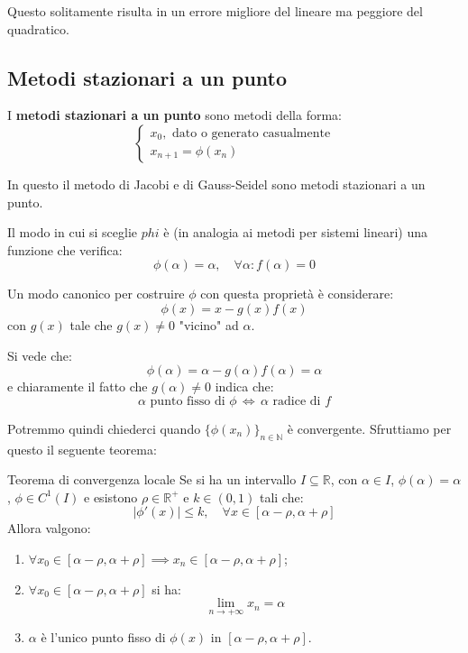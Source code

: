 \documentclass[a4paper,11pt]{article}
\begin{document}
Questo solitamente risulta in un errore migliore del lineare ma peggiore del quadratico.

\subsection{Metodi stazionari a un punto}
I \textbf{metodi stazionari a un punto} sono metodi della forma:
\[
	\begin{cases}
		x_0, \text{ dato o generato casualmente} \\
		x_{n + 1} = \phi(x_n)
	\end{cases}
\]

In questo il metodo di Jacobi e di Gauss-Seidel sono metodi stazionari a un punto.

Il modo in cui si sceglie $phi$ è (in analogia ai metodi per sistemi lineari) una funzione che verifica:
$$
\phi(\alpha) = \alpha, \quad \forall \alpha : f(\alpha) = 0
$$

Un modo canonico per costruire $\phi$ con questa proprietà è considerare:
$$
\phi(x) = x - g(x) f(x)
$$
con $g(x)$ tale che $g(x) \neq 0$ "vicino" ad $\alpha$.

Si vede che:
$$
\phi(\alpha) = \alpha - g(\alpha) f(\alpha) = \alpha
$$
e chiaramente il fatto che $g(\alpha) \neq 0$ indica che:
$$
\alpha \text{ punto fisso di $\phi$} \, \Leftrightarrow \, \alpha \text{ radice di $f$}
$$

Potremmo quindi chiederci quando $\{ \phi(x_n) \}_{n \in \mathbb{N}}$ è convergente.
Sfruttiamo per questo il seguente teorema:
\begin{theorem}{Teorema di convergenza locale}
	Se si ha un intervallo $I \subseteq \mathbb{R}$, con $\alpha \in I$, $\phi(\alpha) = \alpha$, $\phi \in C^1(I)$ e esistono $\rho \in \mathbb{R}^+$ e $k \in (0, 1)$ tali che:
	$$
	|\phi'(x)| \leq k, \quad \forall x \in [\alpha - \rho, \alpha + \rho]
	$$
	Allora valgono:
	\begin{enumerate}
		\item $\forall x_0 \in [\alpha - \rho, \alpha + \rho] \implies x_n \in [\alpha - \rho, \alpha + \rho]$;
		\item $\forall x_0 \in [\alpha - \rho, \alpha + \rho]$ si ha:
			$$
				\lim_{n \rightarrow + \infty} x_n = \alpha
			$$
		\item $\alpha$ è l'unico punto fisso di $\phi(x)$ in $[\alpha - \rho, \alpha + \rho]$.
	\end{enumerate}
\end{theorem}
\end{document}

